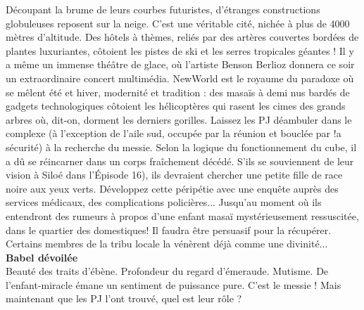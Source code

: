 \documentclass[11pt,twoside,a4paper]{book}
\begin{document}
D{\'e}coupant la brume de leurs courbes futuristes, d'{\'e}tranges constructions globuleuses reposent sur la neige. C'est une v{\'e}ritable cit{\'e}, nich{\'e}e {\`a} plus de 4000 m{\`e}tres d'altitude. Des h{\^o}tels {\`a} th{\`e}mes, reli{\'e}s par des art{\`e}res couvertes bord{\'e}es de plantes luxuriantes, c{\^o}toient les pistes de ski et les serres tropicales g{\'e}antes ! Il y a m{\^e}me un immense th{\'e}{\^a}tre de glace, o{\`u} l'artiste Benson Berlioz donnera ce soir un extraordinaire concert multim{\'e}dia. NewWorld est le royaume du paradoxe o{\`u} se m{\^e}lent {\'e}t{\'e} et hiver, modernit{\'e} et tradition : des masa{\"i}s {\`a} demi nus bard{\'e}s de gadgets technologiques c{\^o}toient les h{\'e}licopt{\`e}res qui rasent les cimes des grands arbres o{\`u}, dit-on, dorment les derniers gorilles. Laissez les PJ d{\'e}ambuler dans le complexe ({\`a} l'exception de l'aile sud, occup{\'e}e par la r{\'e}union et boucl{\'e}e par !a s{\'e}curit{\'e}) {\`a} la recherche du messie. Selon la logique du fonctionnement du cube, il a d{\^u} se r{\'e}incarner dans un corps fra{\^i}chement d{\'e}c{\'e}d{\'e}. S'ils se souviennent de leur vision {\`a} Silo{\'e} dans l'{\'E}pisode 16), ils devraient chercher une petite fille de race noire aux yeux verts. D{\'e}veloppez cette p{\'e}rip{\'e}tie avec une enqu{\^e}te aupr{\`e}s des services m{\'e}dicaux, des complications polici{\`e}res... Jusqu'au moment o{\`u} ils entendront des rumeurs {\`a} propos d'une enfant masa{\"i} myst{\'e}rieusement ressuscit{\'e}e, dans le quartier des domestiques! Il faudra {\^e}tre persuasif pour la r{\'e}cup{\'e}rer. Certains membres de la tribu locale la v{\'e}n{\`e}rent d{\'e}j{\`a} comme une divinit{\'e}...~\\

\textbf{\large Babel d{\'e}voil{\'e}e}~\\

Beaut{\'e} des traits d'{\'e}b{\`e}ne. Profondeur du regard d'{\'e}meraude. Mutisme. De l'enfant-miracle {\'e}mane un sentiment de puissance pure. C'est le messie ! Mais maintenant que les PJ l'ont trouv{\'e}, quel est leur r{\^o}le ?~\\
\end{document}
